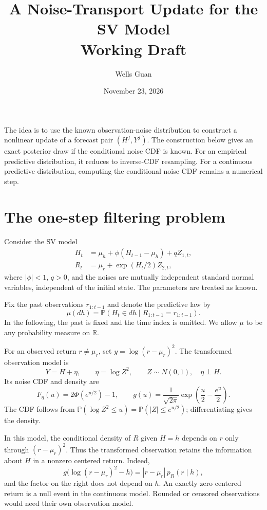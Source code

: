 \documentclass[11pt]{article}
\title{A Noise-Transport Update for the SV Model\\
\large Working Draft}
\author{Wells Guan}
\date{November 23, 2026}
\newcommand{\Pp}{\mathbb P}
\newcommand{\R}{\mathbb R}
\begin{document}
\maketitle

\noindent
The idea is to use the known observation-noise distribution to construct
a nonlinear update of a forecast pair $(H^f,Y^f)$. The construction below
gives an exact posterior draw if the conditional noise CDF is known.
For an empirical predictive distribution, it reduces to inverse-CDF
resampling. For a continuous predictive distribution, computing the
conditional noise CDF remains a numerical step.

\section{The one-step filtering problem}

Consider the SV model
\begin{align*}
H_t&=\mu_h+\phi(H_{t-1}-\mu_h)+qZ_{1,t},\\
R_t&=\mu_r+\exp(H_t/2)Z_{2,t},
\end{align*}
where $|\phi|<1$, $q>0$, and the noises are mutually independent
standard normal variables, independent of the initial state.
The parameters are treated as known.

Fix the past observations $r_{1:t-1}$ and denote the predictive law by
\[
\mu(dh)=\Pp(H_t\in dh\mid R_{1:t-1}=r_{1:t-1}).
\]
In the following, the past is fixed and the time index is omitted.
We allow $\mu$ to be any probability measure on $\R$.

For an observed return $r\ne\mu_r$, set $y=\log(r-\mu_r)^2$. The
transformed observation model is
\[
Y=H+\eta,\qquad \eta=\log Z^2,\qquad Z\sim N(0,1),\quad \eta\perp H.
\]
Its noise CDF and density are
\begin{equation}
F_\eta(u)=2\Phi(e^{u/2})-1,\qquad
g(u)=\frac{1}{\sqrt{2\pi}}
\exp\left(\frac u2-\frac{e^u}{2}\right).
\label{eq:noise}
\end{equation}
The CDF follows from $\Pp(\log Z^2\le u)=\Pp(|Z|\le e^{u/2})$;
differentiating gives the density.

In this model, the conditional density of $R$ given $H=h$ depends on
$r$ only through $(r-\mu_r)^2$. Thus the transformed observation retains
the information about $H$ in a nonzero centered return. Indeed,
\[
g\bigl(\log(r-\mu_r)^2-h\bigr)
=|r-\mu_r|\,p_R(r\mid h),
\]
and the factor on the right does not depend on $h$.
An exactly zero centered return is a null event in the continuous model.
Rounded or censored observations would need their own observation model.
\end{document}

